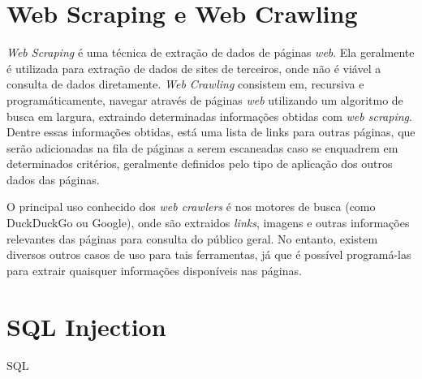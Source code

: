 \section{Web Scraping e Web Crawling}

\textit{Web Scraping} é uma técnica de extração de dados de páginas \textit{web}. Ela geralmente é utilizada para extração de dados de sites de terceiros, onde não é viável a consulta de dados diretamente. 
\textit{Web Crawling} consistem em, recursiva e programáticamente, navegar através de páginas \textit{web} utilizando um algoritmo de busca em largura, extraindo determinadas informações obtidas com \textit{web scraping}. Dentre essas informações obtidas, está uma lista de links para outras páginas, que serão adicionadas na fila de páginas a serem escaneadas caso se enquadrem em determinados critérios, geralmente definidos pelo tipo de aplicação dos outros dados das páginas.

O principal uso conhecido dos \textit{web crawlers} é nos motores de busca (como DuckDuckGo ou Google), onde são extraidos \textit{links}, imagens e outras informações relevantes das páginas para consulta do público geral. No entanto, existem diversos outros casos de uso para tais ferramentas, já que é possível programá-las para extrair quaisquer informações disponíveis nas páginas. 

\section{SQL Injection}

SQL 